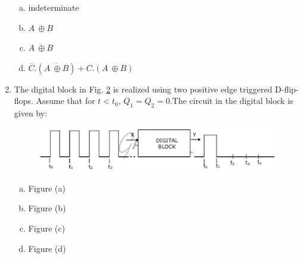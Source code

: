 \documentclass[journal,12pt,twocolumn]{IEEEtran}
\begin{document}
\begin{enumerate}
\begin{figure}
\caption{}

\label{fig:13}

\end{figure} 



\begin{enumerate}[(a)]
 
\item indeterminate

\item $
A \ \oplus B
$

\item $
\overline{A \ \oplus B}
$

\item $
\overline{C}.(\overline{A \ \oplus B})+C.(A \ \oplus B)
$


\end{enumerate}


\item The digital block in Fig. \ref{fig:14} is realized using two positive edge triggered D-flip-flops. Assume that for $t < t_0$, $Q_1=Q_2=0$.The circuit in the digital block is given by:

\begin{figure}

\centering

\includegraphics[width=\columnwidth]{./figs/18.eps}

\caption{}

\label{fig:14}

\end{figure} 


\begin{enumerate}[(a)]
 
\item Figure (a)

\item Figure (b)

\item Figure (c)

\item Figure (d)

\end{enumerate}

\begin{figure}


\end{figure}
\end{enumerate}
\end{document}
